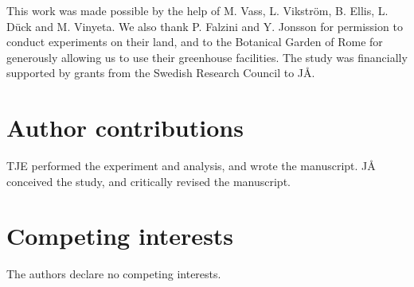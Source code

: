 \documentclass[twocolumn,twoside,lettersize]{article}
\begin{document}
This work was made possible by the help of M. Vass, L. Vikström, B. Ellis, L. D\"{u}ck and M. Vinyeta. We also thank P. Falzini and Y. Jonsson for permission to conduct experiments on their land, and to the Botanical Garden of Rome for generously allowing us to use their greenhouse facilities. The study was financially supported by grants from the Swedish Research Council to JÅ.

\section*{Author contributions}

TJE performed the experiment and analysis, and wrote the manuscript. JÅ conceived the study, and critically revised the manuscript.

\section*{Competing interests}

The authors declare no competing interests.


\end{document}
